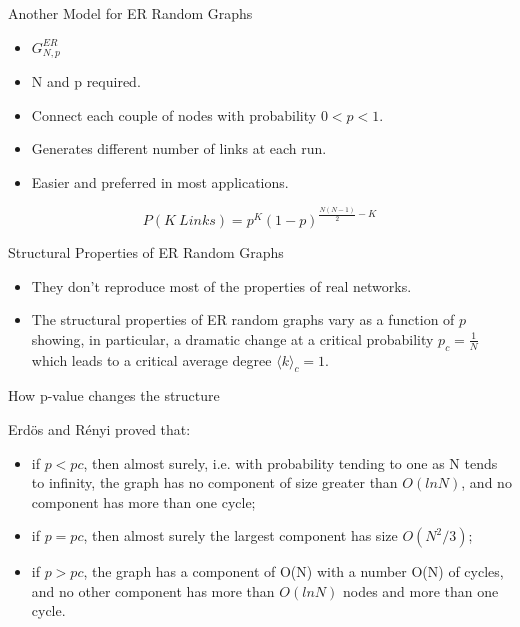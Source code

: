 \documentclass{beamer}
\begin{document}

\begin{frame}{Another Model for ER Random Graphs}

\begin{itemize}
 \item $G_{N,p}^{ER}$
 \item N and p required.
 \item Connect each couple of nodes with probability $0<p<1$.
 \item Generates different number of links at each run.
 \item Easier and preferred in most applications.
\end{itemize}

\[ P(K\ Links) = p^K (1-p)^{ \frac{N(N-1)}{2} - K } \]

\end{frame}


\begin{frame}{Structural Properties of ER Random Graphs}

\begin{itemize}
 \item They don't reproduce most of the properties of real networks.
 \item The structural properties of ER random graphs vary as a function of $p$ showing, in particular, a dramatic change at a critical probability $p_c = \frac{1}{N}$ which leads to a critical average degree $\langle k \rangle_c = 1$.
\end{itemize}

\end{frame}


\begin{frame}{How p-value changes the structure}

Erdös and Rényi proved that:
\begin{itemize}
 \item if $p<pc$, then almost surely, i.e. with probability tending to one as N tends to infinity, the graph has no component of size greater than $O(lnN)$, and no component has more than one cycle;
 \item if $p=pc$, then almost surely the largest component has size $O(N^2/3)$;
 \item if $p>pc$, the graph has a component of O(N) with a number O(N) of cycles, and no other component has more than $O(lnN)$ nodes and more than one cycle.
\end{itemize}

\end{frame}
\end{document}
